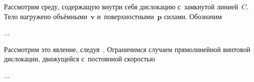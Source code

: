 

\label{section:actionofstressfieldondislocation}

\begin{otherlanguage}{russian}

Рассмотрим среду, содержащую внутри себя дислокацию с~замкнутой линией~$C$.
Тело нагружено объёмными~$\bm{v}$ и~поверхностными~$\bm{p}$ силами.
Обозначим

...


\end{otherlanguage}



\label{section:dislocationmovement}

\begin{otherlanguage}{russian}

Рассмотрим это явление, следуя~\cite{cottrell-dislocations}.
Ограничимся случаем прямо\-линейной винтовой дислокации, движущейся с~постоянной скоростью

...


\end{otherlanguage}



\label{section:pointdefects}

